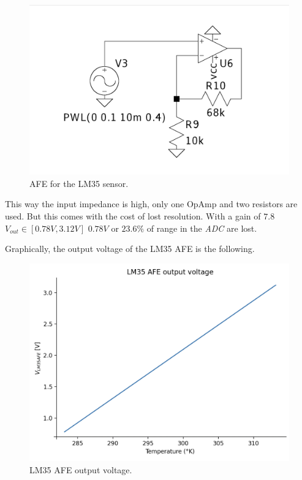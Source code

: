 \documentclass[12pt]{article}
\begin{document}
    \begin{figure}[H] 
        \centering
        \includegraphics*[scale = 0.2]{images/AFELM35.png}
        \caption{AFE for the LM35 sensor.}
        \label{AFELM35}
    \end{figure}

    This way the input impedance is high, only one OpAmp and two resistors are used.
    But this comes with the cost of lost resolution. With a gain of $7.8$ $V_{out}\in[0.78V,3.12V]$
    $0.78V$ or $23.6\%$ of range in the \textit{ADC} are lost.

    Graphically, the output voltage of the LM35 AFE is the following.

    \begin{figure}[H] 
        \centering
        \includegraphics*[scale = 0.5]{images/Outafelm35.png}
        \caption{LM35 AFE output voltage.}
        \label{AFELM35}
    \end{figure}
\end{document}
